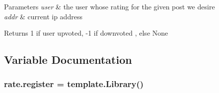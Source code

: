 \begin{DoxyParams}{Parameters}
{\em user} & the user whose rating for the given post we desire \\
\hline
{\em addr} & current ip address \\
\hline
\end{DoxyParams}
\begin{DoxyReturn}{Returns}
1 if user upvoted, -\/1 if downvoted , else \textquotesingle{}None\textquotesingle{} 
\end{DoxyReturn}


\subsection{Variable Documentation}
\subsubsection[{\texorpdfstring{register}{register}}]{\setlength{\rightskip}{0pt plus 5cm}rate.\+register = template.\+Library()}\hypertarget{namespacerate_a57c4e8a03dabaff6331c291c0d5c78fe}{}\label{namespacerate_a57c4e8a03dabaff6331c291c0d5c78fe}
